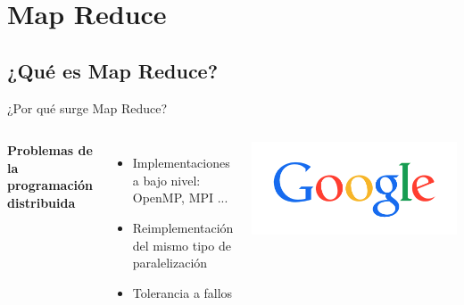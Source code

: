 
\section{Map Reduce}

	\subsection*{¿Qué es Map Reduce?}

		\begin{frame}{¿Por qué surge Map Reduce?}
	
			\begin{columns}
					{\centering\large\color{TurkishRose}\textbf{Problemas de la programación distribuida}}
					\begin{itemize}
						\item Implementaciones a bajo nivel: OpenMP, MPI ...
						\item Reimplementación del mismo tipo de paralelización
						\item Tolerancia a fallos
					\end{itemize}
				
					\includegraphics[width=\textwidth]{./Images/google.png}
			\end{columns}		
			
	
		\end{frame}



